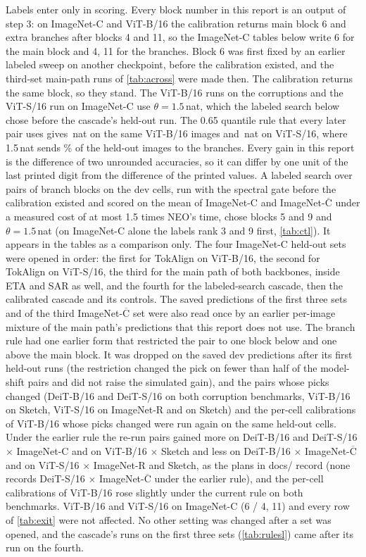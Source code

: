 \documentclass{article}
\newcommand{\tok}{TokAlign}
\newcommand{\neo}{NEO}
\begin{document}
Labels enter only in scoring. Every block number in this report is an output of step 3: on ImageNet-C and ViT-B/16 the calibration returns main block 6 and extra branches after blocks 4 and 11, so the ImageNet-C tables below write 6 for the main block and 4, 11 for the branches. Block 6 was first fixed by an earlier labeled sweep on another checkpoint, before the calibration existed, and the third-set main-path runs of \cref{tab:across} were made then. The calibration returns the same block, so they stand. The ViT-B/16 runs on the corruptions and the ViT-S/16 run on ImageNet-C use $\theta{=}1.5$\,nat, which the labeled search below chose before the cascade's held-out run. The 0.65 quantile rule that every later pair uses gives \,nat on the same ViT-B/16 images and \,nat on ViT-S/16, where 1.5\,nat sends \% of the held-out images to the branches. Every gain in this report is the difference of two unrounded accuracies, so it can differ by one unit of the last printed digit from the difference of the printed values. A labeled search over pairs of branch blocks on the dev cells, run with the spectral gate before the calibration existed and scored on the mean of ImageNet-C and ImageNet-$\overline{\text{C}}$ under a measured cost of at most 1.5 times \neo{}'s time, chose blocks 5 and 9 and $\theta{=}1.5$\,nat (on ImageNet-C alone the labels rank 3 and 9 first, \cref{tab:ctl}). It appears in the tables as a comparison only. The four ImageNet-C held-out sets were opened in order: the first for \tok{} on ViT-B/16, the second for \tok{} on ViT-S/16, the third for the main path of both backbones, inside ETA and SAR as well, and the fourth for the labeled-search cascade, then the calibrated cascade and its controls. The saved predictions of the first three sets and of the third ImageNet-$\overline{\text{C}}$ set were also read once by an earlier per-image mixture of the main path's predictions that this report does not use. The branch rule had one earlier form that restricted the pair to one block below and one above the main block. It was dropped on the saved dev predictions after its first held-out runs (the restriction changed the pick on fewer than half of the model-shift pairs and did not raise the simulated gain), and the pairs whose picks changed (DeiT-B/16 and DeiT-S/16 on both corruption benchmarks, ViT-B/16 on Sketch, ViT-S/16 on ImageNet-R and on Sketch) and the per-cell calibrations of ViT-B/16 whose picks changed were run again on the same held-out cells. Under the earlier rule the re-run pairs gained more on DeiT-B/16 and DeiT-S/16 $\times$ ImageNet-C and on ViT-B/16 $\times$ Sketch and less on DeiT-B/16 $\times$ ImageNet-$\overline{\text{C}}$ and on ViT-S/16 $\times$ ImageNet-R and Sketch, as the plans in docs/ record (none records DeiT-S/16 $\times$ ImageNet-$\overline{\text{C}}$ under the earlier rule), and the per-cell calibrations of ViT-B/16 rose slightly under the current rule on both benchmarks. ViT-B/16 and ViT-S/16 on ImageNet-C (6 / 4, 11) and every row of \cref{tab:exit} were not affected. No other setting was changed after a set was opened, and the cascade's runs on the first three sets (\cref{tab:rulesl}) came after its run on the fourth.
\end{document}

